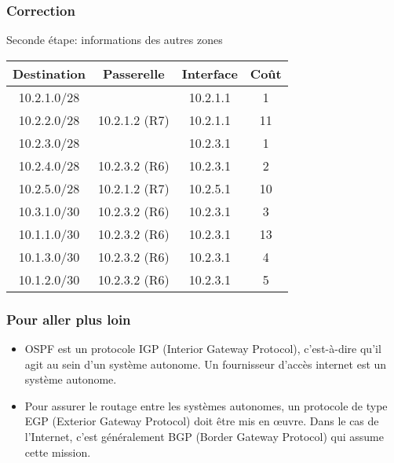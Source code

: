 \documentclass[svgnames,11pt]{beamer}
\begin{document}
\begin{frame}
    \frametitle{Correction}
    Seconde étape: informations des autres zones
    \begin{center}
        \begin{tabular}{|*{4}{c|}}
            \hline
            Destination & Passerelle    & Interface & Coût \\
            \hline
            10.2.1.0/28 &               & 10.2.1.1  & 1    \\
            \hline
            10.2.2.0/28 & 10.2.1.2 (R7) & 10.2.1.1  & 11    \\
            \hline
            10.2.3.0/28 &               & 10.2.3.1  & 1   \\
            \hline
            10.2.4.0/28 & 10.2.3.2 (R6) & 10.2.3.1  & 2    \\
            \hline
            10.2.5.0/28 & 10.2.1.2 (R7) & 10.2.5.1  & 10    \\
            \hline
            10.3.1.0/30 & 10.2.3.2 (R6) & 10.2.3.1  & 3    \\
            \hline
            10.1.1.0/30 & 10.2.3.2 (R6) & 10.2.3.1  & 13    \\
            \hline
            10.1.3.0/30 & 10.2.3.2 (R6) & 10.2.3.1  & 4    \\
            \hline
            10.1.2.0/30 & 10.2.3.2 (R6) & 10.2.3.1  & 5    \\
            \hline
        \end{tabular}
    \end{center}

\end{frame}

\begin{frame}
    \frametitle{Pour aller plus loin}

    \begin{itemize}
        \item<1-> OSPF est un protocole IGP (Interior Gateway Protocol), c'est-à-dire qu'il agit au sein d'un système autonome. Un fournisseur d'accès internet est un système autonome.
        \item<2-> Pour assurer le routage entre les systèmes autonomes, un protocole de type EGP (Exterior Gateway Protocol) doit être mis en œuvre. Dans le cas de l'Internet, c'est généralement BGP (Border Gateway Protocol) qui assume cette mission.
    \end{itemize}

\end{frame}
\end{document}
